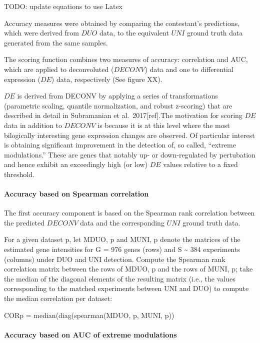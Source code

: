 \documentclass[]{article}
\let\oldparagraph\paragraph
\renewcommand{\paragraph}[1]{\oldparagraph{#1}\mbox{}}
\begin{document}
\color{red}

TODO: update equations to use Latex \color{black}

Accuracy measures were obtained by comparing the contestant's
predictions, which were derived from \(DUO\) data, to the equivalent
\(UNI\) ground truth data generated from the same samples.

The scoring function combines two measures of accuracy: correlation and
AUC, which are applied to deconvoluted (\(DECONV\)) data and one to
differential expression (\(DE\)) data, respectively (See figure XX).

\(DE\) is derived from DECONV by applying a series of transformations
(parametric scaling, quantile normalization, and robust z-scoring) that
are described in detail in Subramanian et al.~2017{[}ref{]}.The
motivation for scoring \(DE\) data in addition to \(DECONV\) is because
it is at this level where the most bilogically interesting gene
expression changes are observed. Of particular interest is obtaining
significant improvement in the detection of, so called, ``extreme
modulations.'' These are genes that notably up- or down-regulated by
pertubation and hence exhibit an exceedingly high (or low) \(DE\) values
relative to a fixed threshold.

\hypertarget{accuracy-based-on-spearman-correlation}{%
\paragraph{Accuracy based on Spearman
correlation}\label{accuracy-based-on-spearman-correlation}}

The first accuracy component is based on the Spearman rank correlation
between the predicted \(DECONV\) data and the corresponding \(UNI\)
ground truth data.

For a given dataset p, let MDUO, p and MUNI, p denote the matrices of
the estimated gene intensities for G = 976 genes (rows) and S
\textasciitilde{} 384 experiments (columns) under DUO and UNI detection.
Compute the Spearman rank correlation matrix between the rows of MDUO, p
and the rows of MUNI, p; take the median of the diagonal elements of the
resulting matrix (i.e., the values corresponding to the matched
experiments between UNI and DUO) to compute the median correlation per
dataset:

CORp = median(diag(spearman(MDUO, p, MUNI, p))

\hypertarget{accuracy-based-on-auc-of-extreme-modulations}{%
\paragraph{Accuracy based on AUC of extreme
modulations}\label{accuracy-based-on-auc-of-extreme-modulations}}
\end{document}
